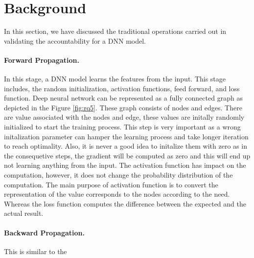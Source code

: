 \section{Background}
\label{sec:background}
In this section, we have discussed the traditional operations carried out in validating the accountability for a DNN model.
\paragraph{Forward Propagation.} In this stage, a DNN model learns the features from the input. This stage includes, the random initialization, activation functions, feed forward, and loss function. Deep neural network can be represented as a fully connected graph as depicted in the Figure \ref{fig:rq5}. These graph consists of nodes and edges. There are value associated with the nodes and edge, these values are initally randomly initialized to start the training process. This step is very important as a wrong initalization parameter can hamper the learning process and take longer iteration to reach optimality. Also, it is never a good idea to initalize them with zero as in the consequetive steps, the gradient will be computed as zero and this will end up not learning anything from the input. The activation function has impact on the computation, however, it does not change the probability distribution of the computation. The main purpose of activation function is to convert the representation of the value corresponds to the nodes according to the need. Whereas the loss function computes the difference between the expected and the actual result.
\paragraph{Backward Propagation.} This is similar to the 
